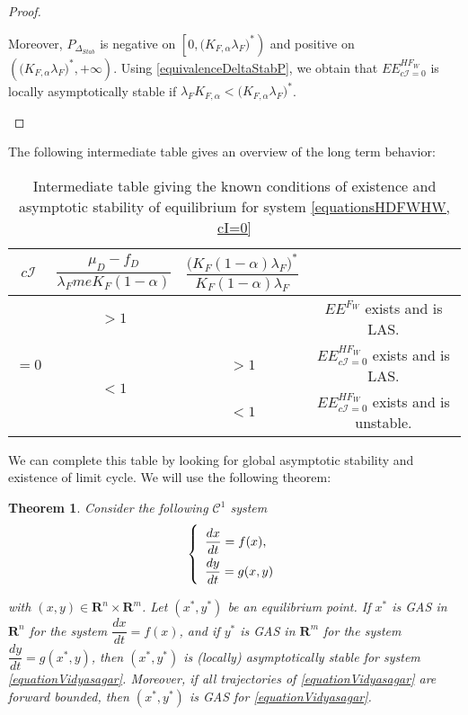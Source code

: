 \documentclass{article}
\newcommand{\lfw}{\lambda_{F}}
\newcommand{\lfw}{\lambda_{F}}
\newcommand{\Kfa}{K_{F,\alpha}}
\newcommand{\cI}{c \mathcal{I}}
\newtheorem{theorem}{Theorem}
\begin{document}
\begin{proof}
\begin{itemize}
Moreover, $P_{\Delta_{Stab}}$ is negative on $\left[0, \Big(\Kfa \lfw \Big)^* \right)$ and positive on $\left(\Big(\Kfa \lfw \Big)^*, +\infty \right)$. Using \eqref{equivalenceDeltaStabP}, we obtain that $EE^{HF_W}_{\cI = 0}$ is locally asymptotically stable if $\lfw \Kfa < \Big(\Kfa \lfw \Big)^*$.

\end{itemize}
\end{proof}


The following intermediate table gives an overview of the long term behavior:

\begin{table}[!ht]
\centering
\def\arraystretch{2}
\begin{tabular}{c|c|c|c}
$\cI$ & $\dfrac{\mu_D - f_D}{\lfw m e K_F(1-\alpha)}$ &  $\dfrac{\Big(K_F(1-\alpha) \lfw \Big)^*}{K_F(1-\alpha) \lfw}$ & \\
\hline
\multirow{3}{*}{$=0$} & $ > 1$ & &$EE^{F_W}$ exists and is LAS.  \\
\cline{2-4}
 & \multirow{2}{*}{$< 1$} & $>1$ &$EE^{HF_W}_{\cI=0}$ exists and is LAS.\\
 \cline{3-4}
 & & $ <1$ &$EE^{HF_W}_{\cI=0}$ exists and is unstable.
\end{tabular}
\caption{\centering Intermediate table giving the known conditions of existence and asymptotic stability of equilibrium for system \eqref{equationsHDFWHW, cI=0}}
\end{table}

We can complete this table by looking for global asymptotic stability and existence of limit cycle. We will use the following theorem:

\begin{theorem}\label{theoremVidyasagar} \cite{vidyasagar_decomposition_1980, dumont_mathematical_2012}
Consider the following $\mathcal{C}^1$ system
\begin{equation}
\def\arraystretch{2}
\left\{ \begin{array}{l}
\dfrac{dx}{dt} = f(x), \\
\dfrac{dy}{dt} = g(x, y) 
\end{array} \right.
\label{equationVidyasagar}
\end{equation}

with $(x, y) \in \mathbf{R}^n \times\mathbf{R}^m$. Let $(x^*, y^*)$ be an equilibrium point.
If $x^*$ is GAS in $\mathbf{R}^n$ for the system $\dfrac{dx}{dt} = f(x)$, and if $y^*$ is GAS in $\mathbf{R}^m$ for the system $\dfrac{dy}{dt} = g(x^*, y)$, then $(x^*, y^*)$ is (locally) asymptotically stable for system \eqref{equationVidyasagar}. Moreover, if all trajectories of \eqref{equationVidyasagar} are forward bounded, then $(x^*, y^*)$ is GAS for \eqref{equationVidyasagar}.
\end{theorem}
\end{document}
